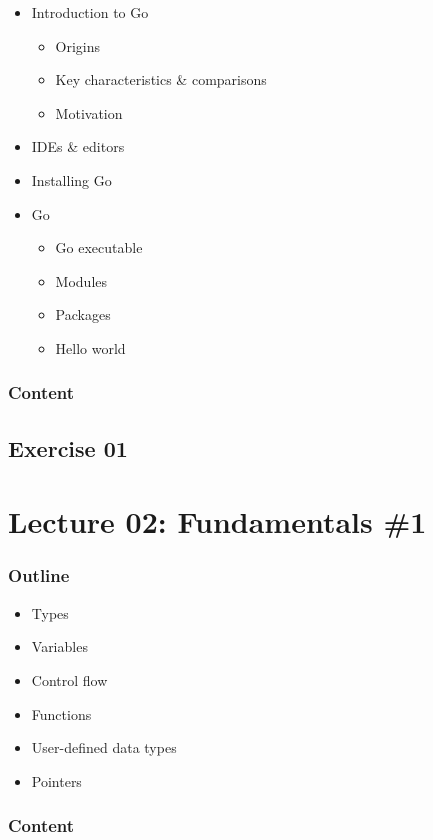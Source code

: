 \documentclass[
  digital,
  color,
  oneside,
  nosansbold,
  nocolorbold,
  lof,
  lot,
]{fithesis4}
\begin{document}
\begin{itemize}
    \item Introduction to Go
    \begin{itemize}
        \item Origins
        \item Key characteristics \& comparisons
        \item Motivation
    \end{itemize}
    \item IDEs \& editors
    \item Installing Go
    \item Go
    \begin{itemize}
        \item Go executable
        \item Modules
        \item Packages
        \item Hello world
    \end{itemize}
\end{itemize}

\subsubsection{Content}

\subsection{Exercise 01}

\section{Lecture 02: Fundamentals \#1}

\subsubsection{Outline}

\begin{itemize}
    \item Types
    \item Variables
    \item Control flow
    \item Functions
    \item User-defined data types
    \item Pointers
\end{itemize}

\subsubsection{Content}
\end{document}
